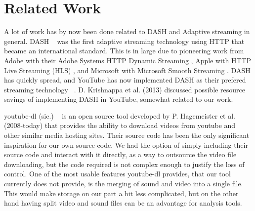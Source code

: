 \section{Related Work}
A lot of work has by now been done related to DASH and Adaptive streaming in
general. DASH ~\cite{iso-dash-2014} was the first adaptive streaming
technology using HTTP that became an international standard. This is in large
due to pioneering work from Adobe with their Adobe Systems HTTP Dynamic Streaming
, 
Apple with HTTP Live Streaming (HLS) , and Microsoft with Microsoft Smooth Streaming . DASH has quickly
spread, and YouTube has now implemented DASH as their prefered streaming technology ~\cite{Google I/O 2013}. 
D. Krishnappa et al. (2013)  discussed possible resource savings of implementing DASH in YouTube,
somewhat related to our work. 

youtube-dl (sic.) ~\cite{youtube-dl} is an open source tool developed by P. Hagemeister et al. (2008-today) that provides
the ability to download videos from youtube and other similar media hosting sites. Their source code has been the only
significant inspiration for our own source code. We had the option of simply including their source code and interact with it
directly, as a way to outsource the video file downloading, but the code required is not complex enough to justify the loss
of control. One of the most usable features youtube-dl provides, that our tool currently does not provide, is the 
merging of sound and video into a single file. This would make storage on our part a bit less complicated, but on the other
hand having split video and sound files can be an advantage for analysis tools. 
